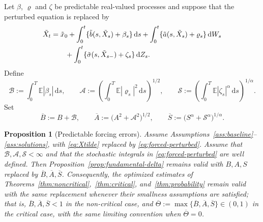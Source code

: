 \documentclass[11pt]{article}
\newtheorem{proposition}[theorem]{Proposition}
\newcommand{\E}{\mathbb{E}}
\newcommand{\1}{\mathbf{1}}
\newcommand{\dd}{\,\mathrm{d}}
\newcommand{\wt}{\tilde}
\begin{document}
Let $\beta$, $\varrho$ and $\zeta$ be predictable real-valued processes and suppose that the perturbed equation is replaced by
\begin{align}
\wt X_t
&=\wt x_0+\int_0^t\{\wt b(s,\wt X_s)+\beta_s\}\dd s
+\int_0^t\{\wt a(s,\wt X_s)+\varrho_s\}\dd W_s \notag\\
&\qquad +\int_0^t\{\wt\sigma(s,\wt X_{s-})+\zeta_s\}\dd Z_s.
\label{eq:forced-perturbed}
\end{align}
Define
\[
  \mathcal B:=\int_0^T\E|\beta_s|\dd s,
  \qquad
  \mathcal A:=\left(\int_0^T\E|\varrho_s|^2\dd s\right)^{1/2},
  \qquad
  \mathcal S:=\left(\int_0^T\E|\zeta_s|^\alpha\dd s\right)^{1/\alpha}.
\]
Set
\[
  \overline B:=B+\mathcal B,
  \qquad
  \overline A:=\bigl(A^2+\mathcal A^2\bigr)^{1/2},
  \qquad
  \overline S:=\bigl(S^\alpha+\mathcal S^\alpha\bigr)^{1/\alpha}.
\]

\begin{proposition}[Predictable forcing errors]\label{prop:forcing}
Assume Assumptions~\ref{ass:baseline}--\ref{ass:solutions}, with \eqref{eq:Xtilde} replaced by \eqref{eq:forced-perturbed}. Assume that $\mathcal B,\mathcal A,\mathcal S<\infty$ and that the stochastic integrals in \eqref{eq:forced-perturbed} are well defined. Then Proposition~\ref{prop:fundamental-delta} remains valid with $B,A,S$ replaced by $\overline B,\overline A,\overline S$. Consequently, the optimized estimates of Theorems~\ref{thm:noncritical},~\ref{thm:critical}, and~\ref{thm:probability} remain valid with the same replacement whenever their smallness assumptions are satisfied; that is, $\overline B,\overline A,\overline S<1$ in the non-critical case, and $\overline\Theta:=\max\{\overline B,\overline A,\overline S\}\in(0,1)$ in the critical case, with the same limiting convention when $\overline\Theta=0$.
\end{proposition}
\end{document}
